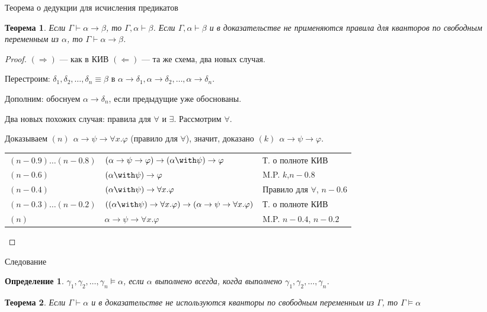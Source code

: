 \documentclass[aspectratio=169]{beamer}
\newtheorem{thm}{Теорема}[section]
\newtheorem{dfn}{Определение}[section]
\begin{document}
\begin{frame}{Теорема о дедукции для исчисления предикатов}
\begin{thm}Если $\Gamma\vdash\alpha\rightarrow\beta$, то $\Gamma,\alpha\vdash\beta$.
Если $\Gamma,\alpha\vdash\beta$ и в доказательстве не применяются правила для кванторов 
по свободным переменным из $\alpha$, то $\Gamma\vdash\alpha\rightarrow\beta$.\end{thm}
\begin{proof}$(\Rightarrow)$ --- как в КИВ \pause $(\Leftarrow)$ --- та же схема, два новых случая. \pause

Перестроим: $\delta_1, \delta_2, \dots, \delta_n \equiv \beta$ в $\alpha\rightarrow\delta_1, \alpha\rightarrow\delta_2, \dots, \alpha\rightarrow\delta_n$.

Дополним: обоснуем $\alpha\rightarrow\delta_n$, если предыдущие уже обоснованы.\pause

Два новых похожих случая: правила для $\forall$ и $\exists$. Рассмотрим $\forall$.

Доказываем $(n)\ \ \alpha\rightarrow\psi\rightarrow\forall x.\varphi$ (правило для $\forall$), значит, доказано  
$(k)\ \ \alpha\rightarrow\psi\rightarrow\varphi$. \pause
\begin{tabular}{lll}
$(n-0.9) \dots (n-0.8)$ & $(\alpha\rightarrow\psi\rightarrow\varphi)\rightarrow(\alpha\with\psi)\rightarrow\varphi$ & Т. о полноте КИВ\\
$(n-0.6)$ & $(\alpha\with\psi)\rightarrow\varphi$ & M.P. $k$,$n-0.8$\\\pause
$(n-0.4)$ & $(\alpha\with\psi)\rightarrow\forall x.\varphi$ & Правило для $\forall$, $n-0.6$\\\pause
$(n-0.3) \dots (n-0.2)$ & $((\alpha\with\psi)\rightarrow\forall x.\varphi)\rightarrow(\alpha\rightarrow\psi\rightarrow\forall x.\varphi)$ & Т. о полноте КИВ\\
$(n)$ & $\alpha\rightarrow\psi\rightarrow\forall x.\varphi$ & M.P. $n-0.4$, $n-0.2$
\end{tabular}

\end{proof}
\end{frame}


\begin{frame}{Следование}
\begin{dfn}$\gamma_1,\gamma_2,\dots,\gamma_n\models\alpha$, если $\alpha$ выполнено всегда, когда выполнено $\gamma_1,\gamma_2,\dots,\gamma_n$.
\end{dfn}

\begin{thm}Если $\Gamma\vdash\alpha$ и в доказательстве не используются кванторы по свободным
переменным из $\Gamma$, то $\Gamma\models\alpha$\end{thm}
\end{frame}
\end{document}
